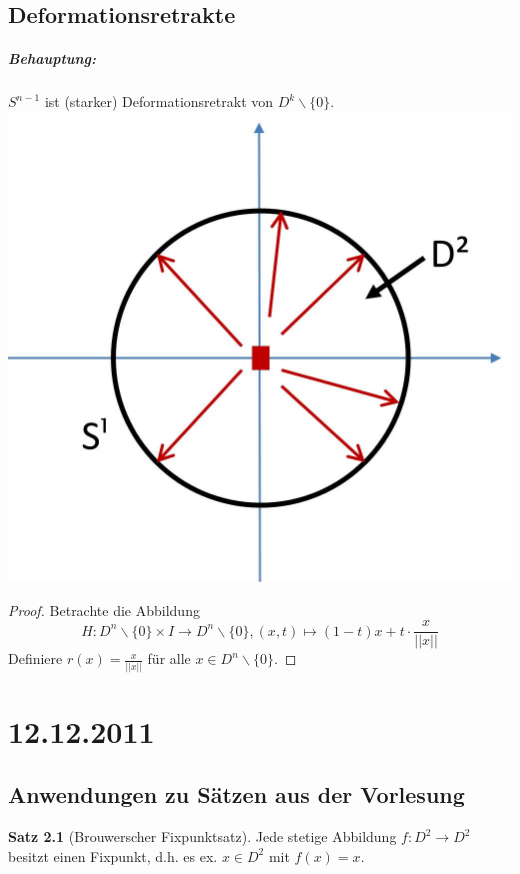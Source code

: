 \documentclass[a4paper,11pt,notitlepage]{report}
\theoremstyle{definition}
\newtheorem{theorem}{Satz}[chapter]
\begin{document}
\section{Deformationsretrakte}
\paragraph{Behauptung:} $S^{n-1}$ ist (starker) Deformationsretrakt von $D^k\backslash \{0\}$. \newline
\includegraphics[scale=0.4]{images/Deformationsretrakt_S1_D2.jpg}

\begin{proof}
	Betrachte die Abbildung $$H \colon D^n \backslash \{0\} \times I \rightarrow D^n \backslash \{0\}, (x,t) \mapsto (1-t)x + t \cdot \frac{x}{||x||}$$
	Definiere $r(x)= \frac{x}{||x||}$ für alle $x \in D^n \backslash \{0\}$.
\end{proof}

\chapter{12.12.2011}
\section{Anwendungen zu Sätzen aus der Vorlesung}
\begin{theorem}[Brouwerscher Fixpunktsatz]
	Jede stetige Abbildung $f \colon D^2 \rightarrow D^2$ besitzt einen Fixpunkt, d.h. es ex. $x \in D^2$ mit $f(x)=x$.
\end{theorem}
\end{document}
